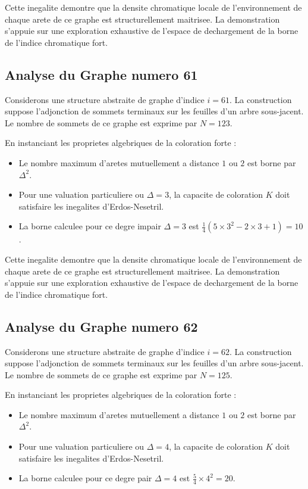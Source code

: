 \documentclass[11pt,a4paper]{article}
\begin{document}
Cette inegalite demontre que la densite chromatique locale de l'environnement de chaque arete de ce graphe est structurellement maitrisee. La demonstration s'appuie sur une exploration exhaustive de l'espace de dechargement de la borne de l'indice chromatique fort.

\subsection{Analyse du Graphe numero 61}
Considerons une structure abstraite de graphe d'indice $i = 61$. La construction suppose l'adjonction de sommets terminaux sur les feuilles d'un arbre sous-jacent. Le nombre de sommets de ce graphe est exprime par $N = 123$.

En instanciant les proprietes algebriques de la coloration forte :
\begin{itemize}
\item Le nombre maximum d'aretes mutuellement a distance $1$ ou $2$ est borne par $\Delta^2$.
\item Pour une valuation particuliere ou $\Delta = 3$, la capacite de coloration $K$ doit satisfaire les inegalites d'Erdos-Nesetril.
\item La borne calculee pour ce degre impair $\Delta = 3$ est $\frac{1}{4}(5 \times 3^2 - 2 \times 3 + 1) = 10$.
\end{itemize}

Cette inegalite demontre que la densite chromatique locale de l'environnement de chaque arete de ce graphe est structurellement maitrisee. La demonstration s'appuie sur une exploration exhaustive de l'espace de dechargement de la borne de l'indice chromatique fort.

\subsection{Analyse du Graphe numero 62}
Considerons une structure abstraite de graphe d'indice $i = 62$. La construction suppose l'adjonction de sommets terminaux sur les feuilles d'un arbre sous-jacent. Le nombre de sommets de ce graphe est exprime par $N = 125$.

En instanciant les proprietes algebriques de la coloration forte :
\begin{itemize}
\item Le nombre maximum d'aretes mutuellement a distance $1$ ou $2$ est borne par $\Delta^2$.
\item Pour une valuation particuliere ou $\Delta = 4$, la capacite de coloration $K$ doit satisfaire les inegalites d'Erdos-Nesetril.
\item La borne calculee pour ce degre pair $\Delta = 4$ est $\frac{5}{4} \times 4^2 = 20$.
\end{itemize}
\end{document}
